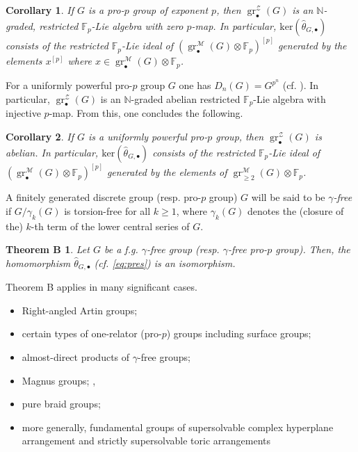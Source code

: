 \documentclass{amsart}
\theoremstyle{plain}
\newtheorem*{theoremB}{Theorem B}
\newtheorem{cor}{Corollary}
\theoremstyle{definition}
\numberwithin{theorem}{section}
\numberwithin{equation}{section}
\newcommand{\gr}{\operatorname{gr}}
\newcommand{\grM}{\operatorname{gr}^{\mathscr M}}
\newcommand{\FF}{\mathbb{F}}
\newcommand{\kernel}{\mathrm{ker}}
\begin{document}
\begin{cor}
\label{cor1}
    If $G$ is a pro-$p$ group of exponent $p$, then $\gr^{\mathcal Z}_\bullet(G)$ is an $\mathbb N$-graded, restricted $\FF_p$-Lie algebra with zero $p$-map. In particular, $\kernel(\hat\theta_{G, \bullet})$ consists of the restricted $\FF_p$-Lie ideal of 
    $(\grM_\bullet(G)\otimes \FF_p)^{[p]}$  generated by the elements $x^{[p]}$ where $x \in \grM_\bullet(G)\otimes \FF_p$.
\end{cor}
\noindent
For a uniformly powerful pro-$p$ group $G$ one has $D_n(G) = G^{p^n}$ (cf. \cite{DDSMS}). In particular, $\gr_\bullet^{\mathcal Z}(G)$ is an $\mathbb N$-graded abelian restricted $\FF_p$-Lie algebra with injective $p$-map. From this, one concludes the following.
\begin{cor}
\label{cor2}
    If $G$ is a uniformly powerful pro-$p$ group, then $\gr^{\mathcal Z}_\bullet(G)$ is abelian. In particular,  $\kernel(\hat\theta_{G, \bullet})$ consists of the restricted $\FF_p$-Lie ideal of $(\grM_\bullet(G)\otimes \FF_p)^{[p]}$ generated by the elements of $\grM_{\geq 2}(G)\otimes \FF_p$. 
\end{cor}

A finitely generated discrete group (resp. pro-$p$ group) $G$ will be said to be \emph{$\gamma$-free} if $G/\gamma_k(G)$ is torsion-free for all $k \geq 1$, where $\gamma_k(G)$ denotes the (closure of the) $k$-th term of the lower central series of $G$.  

\begin{theoremB}
    Let $G$ be a f.g. $\gamma$-free group (resp. $\gamma$-free pro-$p$ group). Then, the homomorphism $\hat\theta_{G, \bullet}$ (cf. \eqref{eq:pres}) is an isomorphism.
\end{theoremB}
\noindent
Theorem B applies in many significant cases. 
\begin{itemize}
    \item Right-angled Artin groups; \cite{BHS20} \cite{PS06}
    \item certain types of one-relator (pro-$p$) groups including surface groups; \cite{Lab70} 
    \item almost-direct products of $\gamma$-free groups; \cite{FR85} 
    \item Magnus groups; \cite{Bau67}, \cite{Shm70}
    \item pure braid groups; \cite{Koh85} 
    \item more generally, fundamental groups of supersolvable complex hyperplane arrangement \cite{FR85} and strictly supersolvable toric arrangements \cite{BD24}
\end{itemize}
\end{document}
